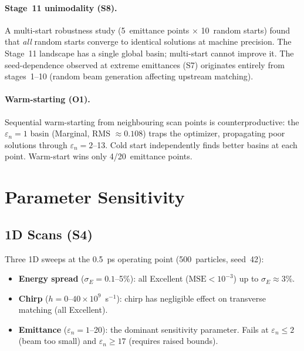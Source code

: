 \documentclass[11pt]{article}
\begin{document}
\paragraph{Stage~11 unimodality (S8).}
A multi-start robustness study (5~emittance points $\times$
10~random starts) found that \emph{all} random starts converge to
identical solutions at machine precision.  The Stage~11 landscape has a
single global basin; multi-start cannot improve it.  The
seed-dependence observed at extreme emittances (S7) originates entirely
from stages~1--10 (random beam generation affecting upstream matching).

\paragraph{Warm-starting (O1).}
Sequential warm-starting from neighbouring scan points is
counterproductive: the $\varepsilon_n = 1$ basin (Marginal, RMS
$\approx 0.108$) traps the optimizer, propagating poor solutions through
$\varepsilon_n = 2$--13.  Cold start independently finds better basins at
each point.  Warm-start wins only 4/20~emittance points.


\section{Parameter Sensitivity}
\label{sec:sensitivity}

\subsection{1D Scans (S4)}

Three 1D sweeps at the 0.5~ps operating point (500~particles, seed~42):
\begin{itemize}[nosep]
  \item \textbf{Energy spread} ($\sigma_E = 0.1$--5\%): all Excellent
    ($\text{MSE} < 10^{-3}$) up to $\sigma_E \approx 3\%$.
  \item \textbf{Chirp} ($h = 0$--$40 \times 10^9$~s$^{-1}$): chirp has
    negligible effect on transverse matching (all Excellent).
  \item \textbf{Emittance} ($\varepsilon_n = 1$--20): the dominant
    sensitivity parameter.  Fails at $\varepsilon_n \leq 2$ (beam too
    small) and $\varepsilon_n \geq 17$ (requires raised bounds).
\end{itemize}
\end{document}
